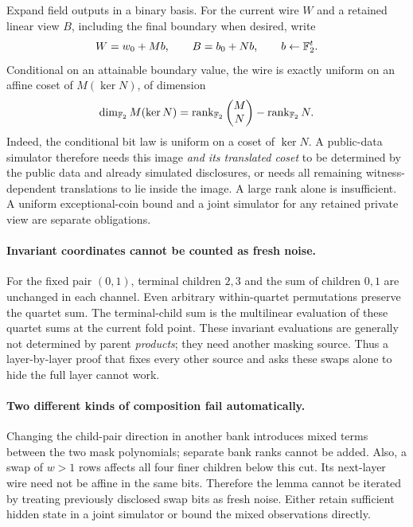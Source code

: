 Expand field outputs in a binary basis. For the current wire $W$ and a retained linear view $B$, including the final boundary when desired, write
\[
 W=w_0+M b,\qquad B=b_0+N b,\qquad b\gets\mathbb{F}_2^t.
\]
Conditional on an attainable boundary value, the wire is exactly uniform on an affine coset of $M(\ker N)$, of dimension
\[
 \dim_{\mathbb{F}_2}M(\ker N)
 =\operatorname{rank}_{\mathbb{F}_2}\begin{pmatrix}M\\N\end{pmatrix}
  -\operatorname{rank}_{\mathbb{F}_2}N.
\]
Indeed, the conditional bit law is uniform on a coset of $\ker N$. A public-data simulator therefore needs this image \emph{and its translated coset} to be determined by the public data and already simulated disclosures, or needs all remaining witness-dependent translations to lie inside the image. A large rank alone is insufficient. A uniform exceptional-coin bound and a joint simulator for any retained private view are separate obligations.

\paragraph{Invariant coordinates cannot be counted as fresh noise.} For the fixed pair $(0,1)$, terminal children $2,3$ and the sum of children $0,1$ are unchanged in each channel. Even arbitrary within-quartet permutations preserve the quartet sum. The terminal-child sum is the multilinear evaluation of these quartet sums at the current fold point. These invariant evaluations are generally not determined by parent \emph{products}; they need another masking source. Thus a layer-by-layer proof that fixes every other source and asks these swaps alone to hide the full layer cannot work.

\paragraph{Two different kinds of composition fail automatically.} Changing the child-pair direction in another bank introduces mixed terms between the two mask polynomials; separate bank ranks cannot be added. Also, a swap of $w>1$ rows affects all four finer children below this cut. Its next-layer wire need not be affine in the same bits. Therefore the lemma cannot be iterated by treating previously disclosed swap bits as fresh noise. Either retain sufficient hidden state in a joint simulator or bound the mixed observations directly.

